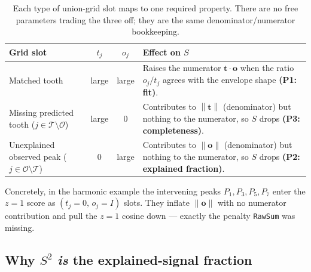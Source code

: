 \documentclass[11pt]{article}
\newcommand{\tvec}{\mathbf{t}}
\newcommand{\ovec}{\mathbf{o}}
\newcommand{\norm}[1]{\left\lVert #1 \right\rVert}
\begin{document}
\begin{table}[h]
\centering
\renewcommand{\arraystretch}{1.35}
\begin{tabular}{@{}p{3.6cm} c c p{5.4cm}@{}}
\toprule
\textbf{Grid slot} & $t_j$ & $o_j$ & \textbf{Effect on $S$} \\
\midrule
Matched tooth
  & large & large
  & Raises the numerator $\tvec\cdot\ovec$ when the ratio $o_j/t_j$ agrees with the
    envelope shape \textbf{(P1: fit)}. \\
Missing predicted tooth ($j\in\mathcal{T}\setminus\mathcal{O}$)
  & large & $0$
  & Contributes to $\norm{\tvec}$ (denominator) but nothing to the numerator, so $S$
    drops \textbf{(P3: completeness)}. \\
Unexplained observed peak ($j\in\mathcal{O}\setminus\mathcal{T}$)
  & $0$ & large
  & Contributes to $\norm{\ovec}$ (denominator) but nothing to the numerator, so $S$
    drops \textbf{(P2: explained fraction)}. \\
\bottomrule
\end{tabular}
\caption{Each type of union-grid slot maps to one required property. There are no
free parameters trading the three off; they are the same denominator/numerator
bookkeeping.}
\label{tab:mapping}
\end{table}

Concretely, in the harmonic example the intervening peaks $P_1,P_3,P_5,P_7$ enter
the $z{=}1$ score as $(t_j = 0,\, o_j = I)$ slots. They inflate $\norm{\ovec}$ with
no numerator contribution and pull the $z{=}1$ cosine down --- exactly the penalty
\texttt{RawSum} was missing.

\subsection{Why $S^2$ \emph{is} the explained-signal fraction}
\end{document}
